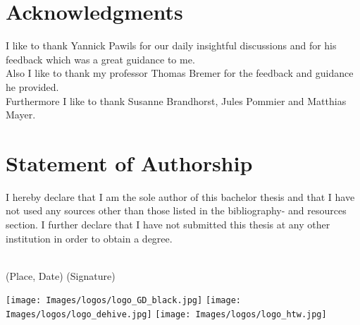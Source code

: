 \documentclass[a4paper, twoside, 10pt]{report}
\begin{document}
\tableofcontents
\clearpage













\printbibliography
\newpage

\listoffigures



\chapter*{Acknowledgments}
I like to thank Yannick Pawils for our daily insightful discussions and for his feedback which was a great guidance to me. \\
Also I like to thank my professor Thomas Bremer for the feedback and guidance he provided.\\
Furthermore I like to thank Susanne Brandhorst, Jules Pommier and Matthias Mayer.



\chapter*{Statement of Authorship}
I hereby declare that I am the sole author of this bachelor thesis and that I have not used any sources other than those listed in the bibliography- and resources section. I further declare that I have not submitted this thesis at any other institution in order to obtain a degree.
\begin{spacing}{5}
\null
\begin{spacing}{1}
\noindent
\dotfill \space \space \dotfill \\
(Place, Date) \hfill (Signature)\hfill \null
\end{spacing}
\end{spacing}



\newpage
\pagestyle{empty}
\centering
\vfill
\texttt{[image: Images/logos/logo\_GD\_black.jpg]}
\vfill
\vspace*{-2cm}
\texttt{[image: Images/logos/logo\_dehive.jpg]}
\vfill
\texttt{[image: Images/logos/logo\_htw.jpg]}
\vfill



\blankpage
\blankpage
\blankpage

\end{document}
